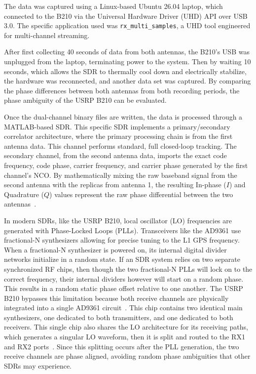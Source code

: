 \documentclass[conference]{IEEEtran}
\begin{document}
The data was captured using a Linux-based Ubuntu 26.04 laptop, which connected to the B210 via the Universal Hardware Driver (UHD) API over USB 3.0. The specific application used was \texttt{rx\_multi\_samples}, a UHD tool engineered for multi-channel streaming.

After first collecting 40 seconds of data from both antennas, the B210's USB was unplugged from the laptop, terminating power to the system. Then by waiting 10 seconds, which allows the SDR to thermally cool down and electrically stabilize, the hardware was reconnected, and another data set was captured. By comparing the phase differences between both antennas from both recording periods, the phase ambiguity of the USRP B210 can be evaluated.

Once the dual-channel binary files are written, the data is processed through a MATLAB-based SDR. This specific SDR implements a primary/secondary correlator architecture, where the primary processing chain is from the first antenna data. This channel performs standard, full closed-loop tracking. The secondary channel, from the second antenna data, imports the exact code frequency, code phase, carrier frequency, and carrier phase generated by the first channel's NCO. By mathematically mixing the raw baseband signal from the second antenna with the replicas from antenna 1, the resulting In-phase ($I$) and Quadrature ($Q$) values represent the raw phase differential between the two antennas~\cite{chen2010realtime,chen2013validation}.


In modern SDRs, like the USRP B210, local oscillator (LO) frequencies are generated with Phase-Locked Loops (PLLs). Transceivers like the AD9361 use fractional-N synthesizers allowing for precise tuning to the L1 GPS frequency. When a fractional-N synthesizer is powered on, its internal digital divider networks initialize in a random state. If an SDR system relies on two separate synchronized RF chips, then though the two fractional-N PLLs will lock on to the correct frequency, their internal dividers however will start on a random phase. This results in a random static phase offset relative to one another. The USRP B210 bypasses this limitation because both receive channels are physically integrated into a single AD9361 circuit~\cite{ad9361}. This chip contains two identical main synthesizers, one dedicated to both transmitters, and one dedicated to both receivers. This single chip also shares the LO architecture for its receiving paths, which generates a singular LO waveform, then it is split and routed to the RX1 and RX2 ports~\cite{ad9361}. Since this splitting occurs after the PLL generation, the two receive channels are phase aligned, avoiding random phase ambiguities that other SDRs may experience.
\end{document}
